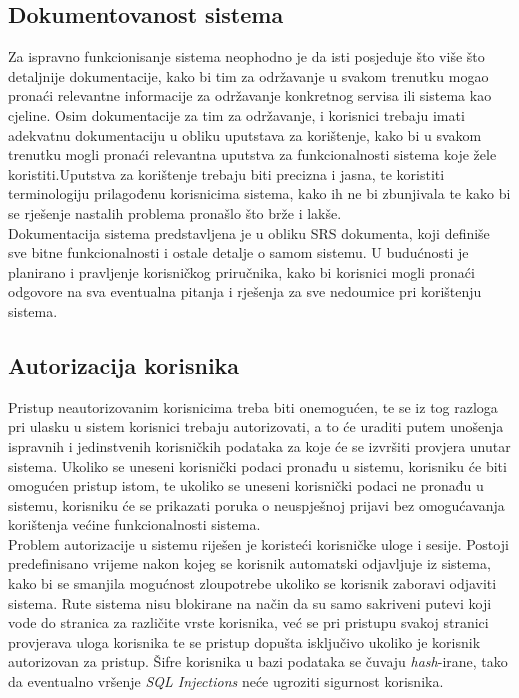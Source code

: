 \documentclass[12pt,a4paper]{article}
\begin{document}
\subsection{Dokumentovanost sistema}

\quad Za ispravno funkcionisanje sistema neophodno je da isti posjeduje što više što detaljnije dokumentacije, kako bi tim za održavanje u svakom trenutku mogao pronaći relevantne informacije za održavanje konkretnog servisa ili sistema kao cjeline. Osim dokumentacije za tim za održavanje, i korisnici trebaju imati adekvatnu dokumentaciju u obliku uputstava za korištenje, kako bi u svakom trenutku mogli pronaći relevantna uputstva za funkcionalnosti sistema koje žele koristiti.Uputstva za korištenje trebaju biti precizna i jasna, te koristiti terminologiju prilagođenu korisnicima sistema, kako ih ne bi zbunjivala te kako bi se rješenje nastalih problema pronašlo što brže i lakše. \\

Dokumentacija sistema predstavljena je u obliku SRS dokumenta, koji definiše sve bitne funkcionalnosti i ostale detalje o samom sistemu. U budućnosti je planirano i pravljenje korisničkog priručnika, kako bi korisnici mogli pronaći odgovore na sva eventualna pitanja i rješenja za sve nedoumice pri korištenju sistema.

\subsection{Autorizacija korisnika}

\quad Pristup neautorizovanim korisnicima treba biti onemogućen, te se iz tog razloga pri ulasku u sistem korisnici trebaju autorizovati, a to će uraditi putem unošenja ispravnih i jedinstvenih korisničkih podataka za koje će se izvršiti provjera unutar sistema. Ukoliko se uneseni korisnički podaci pronađu u sistemu, korisniku će biti omogućen pristup istom, te ukoliko se uneseni korisnički podaci ne pronađu u sistemu, korisniku će se prikazati poruka o neuspješnoj prijavi bez omogućavanja korištenja većine funkcionalnosti sistema. \\

Problem autorizacije u sistemu riješen je koristeći korisničke uloge i sesije. Postoji predefinisano vrijeme nakon kojeg se korisnik automatski odjavljuje iz sistema, kako bi se smanjila mogućnost zloupotrebe ukoliko se korisnik zaboravi odjaviti sistema. Rute sistema nisu blokirane na način da su samo sakriveni putevi koji vode do stranica za različite vrste korisnika, već se pri pristupu svakoj stranici provjerava uloga korisnika te se pristup dopušta isključivo ukoliko je korisnik autorizovan za pristup. Šifre korisnika u bazi podataka se čuvaju \textit{hash}-irane, tako da eventualno vršenje \textit{SQL Injections} neće ugroziti sigurnost korisnika.
\end{document}

